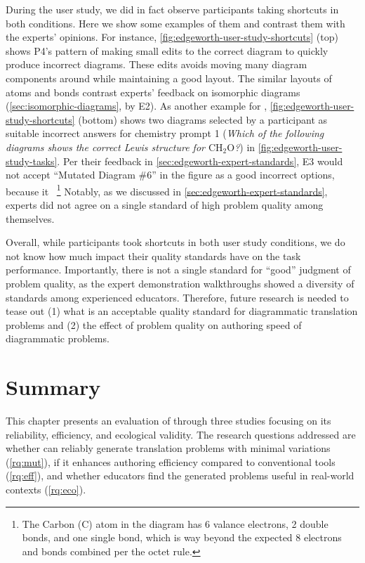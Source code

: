 During the user study, we did in fact observe participants taking shortcuts in both conditions. Here we show some examples of them and contrast them with the experts' opinions. For instance, \cref{fig:edgeworth-user-study-shortcuts} (top) shows P4's pattern of making small edits to the correct diagram to quickly produce incorrect diagrams. These edits avoids moving many diagram components around while maintaining a good layout. The similar layouts of atoms and bonds contrast experts' feedback on isomorphic diagrams (\cref{sec:isomorphic-diagrams}, \eg {} by E2). As another example for \Edgeworth, \cref{fig:edgeworth-user-study-shortcuts} (bottom) shows two diagrams selected by a participant as suitable incorrect answers for chemistry prompt 1 (\textit{Which of the following diagrams shows the correct Lewis structure for \ensuremath{\mathrm{CH_2O}}?}) in \cref{fig:edgeworth-user-study-tasks}. Per their feedback in \cref{sec:edgeworth-expert-standards}, E3 would not accept ``Mutated Diagram \#6'' in the figure as a good incorrect options, because it ~\footnote{The Carbon (C) atom in the diagram has 6 valance electrons, 2 double bonds, and one single bond, which is way beyond the expected 8 electrons and bonds combined per the octet rule.} Notably, as we discussed in \cref{sec:edgeworth-expert-standards}, experts did not agree on a single standard of high problem quality among themselves. 

Overall, while participants took shortcuts in both user study conditions, we do not know how much impact their quality standards have on the task performance. Importantly, there is not a single standard for ``good'' judgment of problem quality, as the expert demonstration walkthroughs showed a diversity of standards among experienced educators. Therefore, future research is needed to tease out (1) what is an acceptable quality standard for diagrammatic translation problems and (2) the effect of problem quality on authoring speed of diagrammatic problems. 

\section{Summary}

This chapter presents an evaluation of \Edgeworth through three studies focusing on its reliability, efficiency, and ecological validity. The research questions addressed are whether \Edgeworth can reliably generate translation problems with minimal variations (\ref{rq:mut}), if it enhances authoring efficiency compared to conventional tools (\ref{rq:eff}), and whether educators find the generated problems useful in real-world contexts (\ref{rq:eco}).

